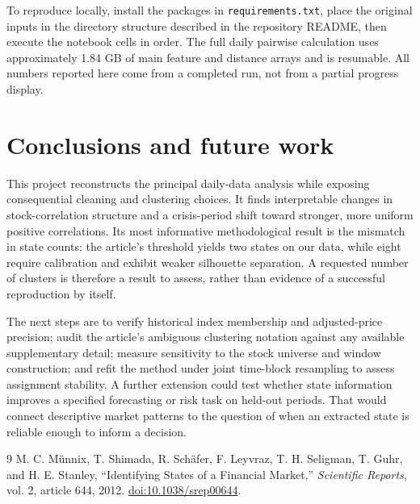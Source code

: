 \documentclass[11pt,a4paper]{article}
\begin{document}
To reproduce locally, install the packages in \texttt{requirements.txt}, place the original inputs in the directory structure described in the repository README, then execute the notebook cells in order. The full daily pairwise calculation uses approximately 1.84 GB of main feature and distance arrays and is resumable. All numbers reported here come from a completed run, not from a partial progress display.

\section{Conclusions and future work}
This project reconstructs the principal daily-data analysis while exposing consequential cleaning and clustering choices. It finds interpretable changes in stock-correlation structure and a crisis-period shift toward stronger, more uniform positive correlations. Its most informative methodological result is the mismatch in state counts: the article's threshold yields two states on our data, while eight require calibration and exhibit weaker silhouette separation. A requested number of clusters is therefore a result to assess, rather than evidence of a successful reproduction by itself.

The next steps are to verify historical index membership and adjusted-price precision; audit the article's ambiguous clustering notation against any available supplementary detail; measure sensitivity to the stock universe and window construction; and refit the method under joint time-block resampling to assess assignment stability. A further extension could test whether state information improves a specified forecasting or risk task on held-out periods. That would connect descriptive market patterns to the question of when an extracted state is reliable enough to inform a decision.

\begingroup\small
\begin{thebibliography}{9}
M. C. M\"unnix, T. Shimada, R. Sch\"afer, F. Leyvraz, T. H. Seligman, T. Guhr, and H. E. Stanley, ``Identifying States of a Financial Market,'' \emph{Scientific Reports}, vol. 2, article 644, 2012. \href{https://doi.org/10.1038/srep00644}{doi:10.1038/srep00644}.
\end{thebibliography}
\endgroup
\end{document}
